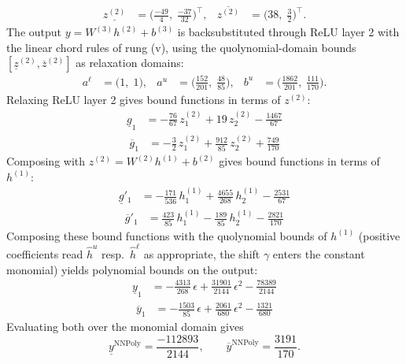 \documentclass[11pt]{article}
\begin{document}
\begin{align*}
\underline{z^{(2)}} &= \bigl(\frac{-49}{4},\; \frac{-37}{32}\bigr)^{\!\top}, & \overline{z^{(2)}} &= \bigl(38,\; \frac{3}{2}\bigr)^{\!\top}.
\end{align*}
The output $y = W^{(3)} h^{(2)} + b^{(3)}$ is backsubstituted through ReLU layer 2 with the linear chord rules of rung (v), using the quolynomial-domain bounds
$[\underline{z}^{(2)}, \overline{z}^{(2)}]$ as relaxation domains:
\begin{align*}
a^{\ell} &= \bigl(1,\; 1\bigr), & a^{u} &= \bigl(\frac{152}{201},\; \frac{48}{85}\bigr), & b^{u} &= \bigl(\frac{1862}{201},\; \frac{111}{170}\bigr).
\end{align*}
Relaxing ReLU layer 2 gives bound functions in terms of $z^{(2)}$:
\begin{align*}
\underline{g}_{1} &= -\frac{76}{67}\,z^{(2)}_{1} + 19\,z^{(2)}_{2} - \frac{1467}{67}
\end{align*}
\begin{align*}
\overline{g}_{1} &= -\frac{3}{2}\,z^{(2)}_{1} + \frac{912}{85}\,z^{(2)}_{2} + \frac{749}{170}
\end{align*}
Composing with $z^{(2)} = W^{(2)} h^{(1)} + b^{(2)}$ gives bound functions in terms of $h^{(1)}$:
\begin{align*}
\underline{g}'_{1} &= -\frac{171}{536}\,h^{(1)}_{1} + \frac{4655}{268}\,h^{(1)}_{2} - \frac{2531}{67}
\end{align*}
\begin{align*}
\overline{g}'_{1} &= \frac{423}{85}\,h^{(1)}_{1} - \frac{189}{85}\,h^{(1)}_{2} - \frac{2821}{170}
\end{align*}
Composing these bound functions with the quolynomial bounds of $h^{(1)}$ (positive
coefficients read $\hat{h}^{u}$ resp.\ $\hat{h}^{\ell}$ as appropriate, the shift $\gamma$ enters the
constant monomial) yields polynomial bounds on the output:
\begin{align*}
\underline{y}_{1} &= -\frac{4313}{268}\,\epsilon + \frac{31901}{2144}\,\epsilon^2 - \frac{78389}{2144}
\end{align*}
\begin{align*}
\overline{y}_{1} &= -\frac{1503}{85}\,\epsilon + \frac{2061}{680}\,\epsilon^2 - \frac{1321}{680}
\end{align*}
Evaluating both over the monomial domain gives
\begin{equation*}
\underline{y}^{\text{NNPoly}} = \frac{-112893}{2144}, \qquad \overline{y}^{\text{NNPoly}} = \frac{3191}{170}.
\end{equation*}
\end{document}
